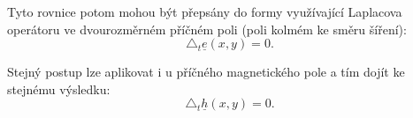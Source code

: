 \documentclass[12pt,a4paper,oneside]{article}
\numberwithin{equation}{section} %
\numberwithin{figure}{section} %
\numberwithin{table}{section} %
\newcommand{\faz}[1]{{\underline{#1}}} %
\begin{document}
Tyto rovnice potom mohou být přepsány do formy využívající Laplacova operátoru ve dvourozměrném příčném poli (poli kolmém ke směru šíření):
\begin{equation}
\triangle _t \faz{e} (x, y) = 0 .
\end{equation}


Stejný postup lze aplikovat i u příčného magnetického pole a tím dojít ke stejnému výsledku:
\begin{equation}
\triangle _t \faz{h} (x, y) = 0 .
\end{equation}


%
%
\end{document}
